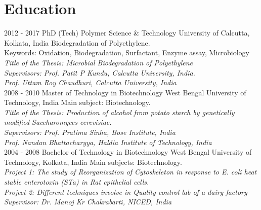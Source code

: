 \documentclass[]{friggeri-cv}
\begin{document}
\section{Education}
\begin{entrylist}
  \entry
    {2012 - 2017}
    {PhD (Tech) Polymer Science \& Technology}
    {University of Calcutta, Kolkata, India}
    {Biodegradation of Polyethylene.\\
    Keywords: Oxidation, Biodegradation, Surfactant, Enzyme assay, Microbiology\\
    \emph{Title of the Thesis: Microbial Biodegradation of Polyethylene}\\
    \emph{Supervisors: Prof. Patit P Kundu, Calcutta University, India.\\ Prof. Uttam Roy Chaudhuri, Calcutta University, India}\\}
  \entry
    {2008 - 2010}
    {Master of Technology in Biotechnology}
    {West Bengal University of Technology, India}
    {Main subject: Biotechnology.\\
    \emph{Title of the Thesis: Production of alcohol from potato starch by genetically modified Saccharomyces cerevisiae.}\\
    \emph{Supervisors: Prof. Pratima Sinha, Bose Institute, India \\Prof. Nandan Bhattacharyya, Haldia Institute of Technology, India}\\}
\entry
	{2004 - 2008}
	{Bachelor of Technology in Biotechnology}
	{West Bengal University of Technology, Kolkata, India}
	{Main subjects: Biotechnology.\\
	\emph{Project 1: The study of Reorganization of Cytoskeleton in response to \textit{E. coli} heat stable enterotoxin (STa) in Rat epithelial cells.}\\
	\emph{Project 2: Different techniques involve in Quality control lab of a dairy factory}\\
	\emph{Supervisor: Dr. Manoj Kr Chakrabarti, NICED, India}\\}
\end{entrylist}
\newpage
\end{document}
